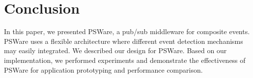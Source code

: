 \section{Conclusion}
\label{sec:conclusion}
In this paper, we presented PSWare, a pub/sub middleware for composite events. PSWare uses a flexible architecture where different event detection mechanisms may easily integrated. We described our design for PSWare. Based on our implementation, we performed experiments and demonstrate the effectiveness of PSWare for application prototyping and performance comparison.
